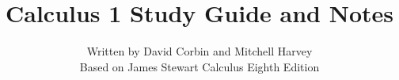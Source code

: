 \documentclass[a4paper]{article}
\begin{document}
\title{Calculus 1 Study Guide and Notes}
\date{}
\author{Written by David Corbin and Mitchell Harvey\\ \small{Based on James Stewart Calculus Eighth Edition}}
\maketitle{}


\end{document}
